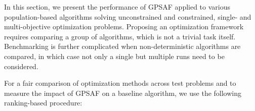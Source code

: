 \documentclass[journal]{IEEEtran}
\begin{document}



In this section, we present the performance of GPSAF applied to various population-based algorithms solving unconstrained and constrained, single- and multi-objective optimization problems.
Proposing an optimization framework requires comparing a group of algorithms, which is not a trivial task itself. Benchmarking is further complicated when non-deterministic algorithms are compared, in which case not only a single but multiple runs need to be considered.

For a fair comparison of optimization methods across test problems and to measure the impact of GPSAF on a baseline algorithm, we use the following ranking-based procedure:

\vspace{1mm}
\end{document}
